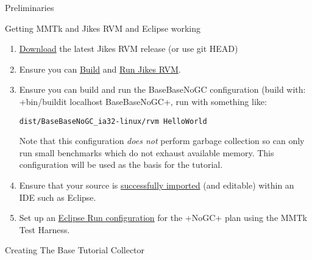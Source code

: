 \begin{chapter}{Preliminaries}
\label{cha:preliminaries}

\begin{section}{Getting MMTk and Jikes RVM and Eclipse working}
\begin{enumerate}
  \item \hyperref[cha:getthesource]{Download} the latest Jikes RVM release (or use git HEAD)
  \item Ensure you can \hyperref[cha:buildingjikesrvm]{Build} and \hyperref[cha:runningjikesrvm]{Run Jikes RVM}.
  \item Ensure you can build and run the BaseBaseNoGC configuration (build with: \spverb+bin/buildit localhost BaseBaseNoGC+, run with something like:
    \begin{lstlisting}
dist/BaseBaseNoGC_ia32-linux/rvm HelloWorld
    \end{lstlisting}
    Note that this configuration \textit{does not} perform garbage collection so can only run small benchmarks which do not exhaust available memory. This configuration will be used as the basis for the tutorial.
  \item Ensure that your source is \hyperref[sec:editingjikesrvminanide]{successfully imported} (and editable) within an IDE such as Eclipse.
  \item Set up an \hyperref[cha:themmtktestharness]{Eclipse Run configuration} for the \spverb+NoGC+ plan using the MMTk Test Harness.
\end{enumerate}

\end{section}

\begin{section}{Creating The Base Tutorial Collector}


\end{section}
\end{chapter}
